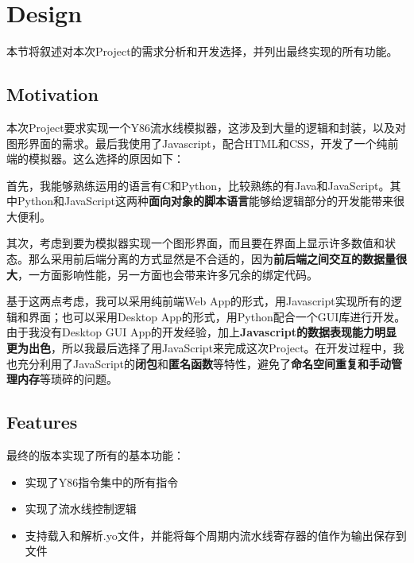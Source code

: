 
\section{Design}

本节将叙述对本次Project的需求分析和开发选择，并列出最终实现的所有功能。

\subsection{Motivation}

本次Project要求实现一个Y86流水线模拟器，这涉及到大量的逻辑和封装，以及对图形界面的需求。最后我使用了Javascript，配合HTML和CSS，开发了一个纯前端的模拟器。这么选择的原因如下：

首先，我能够熟练运用的语言有C和Python，比较熟练的有Java和JavaScript。其中Python和JavaScript这两种{\bf 面向对象的脚本语言}能够给逻辑部分的开发能带来很大便利。

其次，考虑到要为模拟器实现一个图形界面，而且要在界面上显示许多数值和状态。那么采用前后端分离的方式显然是不合适的，因为{\bf 前后端之间交互的数据量很大}，一方面影响性能，另一方面也会带来许多冗余的绑定代码。

基于这两点考虑，我可以采用纯前端Web App的形式，用Javascript实现所有的逻辑和界面；也可以采用Desktop App的形式，用Python配合一个GUI库进行开发。由于我没有Desktop GUI App的开发经验，加上{\bf Javascript的数据表现能力明显更为出色}，所以我最后选择了用JavaScript来完成这次Project。在开发过程中，我也充分利用了JavaScript的{\bf 闭包}和{\bf 匿名函数}等特性，避免了{\bf 命名空间重复和手动管理内存}等琐碎的问题。

\subsection{Features}

最终的版本实现了所有的基本功能：
\begin{itemize}
\item 实现了Y86指令集中的所有指令
\item 实现了流水线控制逻辑
\item 支持载入和解析.yo文件，并能将每个周期内流水线寄存器的值作为输出保存到文件
\end{itemize}

